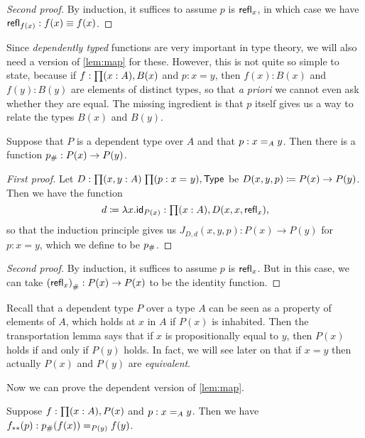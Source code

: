 \begin{proof}[Second proof]
  By induction, it suffices to assume $p$ is $\refl{x}$, in which case we have $\refl{f(x)}:f(x)\jdeq f(x)$.
\end{proof}

Since \emph{dependently typed} functions are very important in type theory, we will also need a version of \autoref{lem:map} for these.
However, this is not quite so simple to state, because if $f:\prd{x:A} B(x)$ and $p:x=y$, then $f(x):B(x)$ and $f(y):B(y)$ are elements of distinct types, so that \emph{a priori} we cannot even ask whether they are equal.
The missing ingredient is that $p$ itself gives us a way to relate the types $B(x)$ and $B(y)$.

\begin{lem}[Transport]\label{lem:transport}
  Suppose that $P$ is a dependent type over $A$ and that $p:\id[A]xy$.
  Then there is a function $\transf{p}:P(x)\to P(y)$.
\end{lem}

\begin{proof}[First proof]
  Let $D:\prd{x,y:A}{p:\id{x}{y}} \type$ be $D(x,y,p)\defeq P(x)\to P(y)$.
  Then we have the function
  \begin{equation*}
    d\defeq\lambda x.\idfunc[P(x)]:\prd{x:A} D(x,x,\refl{x}),
  \end{equation*}
  so that the induction principle gives us $J_{D,d}(x,y,p):P(x)\to P(y)$ for $p:x= y$, which we define to be $\transf p$.
\end{proof}

\begin{proof}[Second proof]
  By induction, it suffices to assume $p$ is $\refl x$.
  But in this case, we can take $\transf{(\refl x)}:P(x)\to P(x)$ to be the identity function.
\end{proof}

Recall that a dependent type $P$ over a type $A$ can be seen as a property of elements of $A$, which holds at $x$ in $A$ if $P(x)$ is inhabited.
Then the transportation lemma says that if $x$ is propositionally equal to $y$, then $P(x)$ holds if and only if $P(y)$ holds.
In fact, we will see later on that if $x=y$ then actually $P(x)$ and $P(y)$ are \emph{equivalent}.

Now we can prove the dependent version of \autoref{lem:map}.

\begin{lem}\label{lem:mapdep}
  Suppose $f:\prd{x: A} P(x)$ and $p:\id[A]xy$.
  Then we have $\mapdep fp:\id[P(y)]{\trans p{f(x)}}{f(y)}$.
\end{lem}

